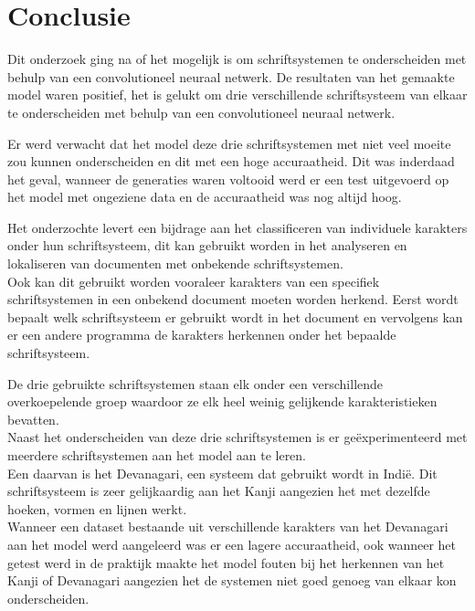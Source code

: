 
\chapter{Conclusie}
\label{ch:conclusie}


Dit onderzoek ging na of het mogelijk is om schriftsystemen te onderscheiden met behulp van een convolutioneel neuraal netwerk.
De resultaten van het gemaakte model waren positief, het is gelukt om drie verschillende schriftsysteem van elkaar te onderscheiden met behulp van een convolutioneel neuraal netwerk.

Er werd verwacht dat het model deze drie schriftsystemen met niet veel moeite zou kunnen onderscheiden en dit met een hoge accuraatheid.
Dit was inderdaad het geval, wanneer de generaties waren voltooid werd er een test uitgevoerd op het model met ongeziene data en de accuraatheid was nog altijd hoog.

Het onderzochte levert een bijdrage aan het classificeren van individuele karakters onder hun schriftsysteem, dit kan gebruikt worden in het analyseren en lokaliseren van documenten met onbekende schriftsystemen.\\
Ook kan dit gebruikt worden vooraleer karakters van een specifiek schriftsystemen in een onbekend document moeten worden herkend. Eerst wordt bepaalt welk schriftsysteem er gebruikt wordt in het document en vervolgens kan er een andere programma de karakters herkennen onder het bepaalde schriftsysteem.

De drie gebruikte schriftsystemen staan elk onder een verschillende overkoepelende groep waardoor ze elk heel weinig gelijkende karakteristieken bevatten. \\
Naast het onderscheiden van deze drie schriftsystemen is er geëxperimenteerd met meerdere schriftsystemen aan het model aan te leren.\\
Een daarvan is het Devanagari, een systeem dat gebruikt wordt in Indië.
Dit schriftsysteem is zeer gelijkaardig aan het Kanji aangezien het met dezelfde hoeken, vormen en lijnen werkt.\\
Wanneer een dataset bestaande uit verschillende karakters van het Devanagari aan het model werd aangeleerd was er een lagere accuraatheid, ook wanneer het getest werd in de praktijk maakte het model fouten bij het herkennen van het Kanji of Devanagari aangezien het de systemen niet goed genoeg van elkaar kon onderscheiden.


